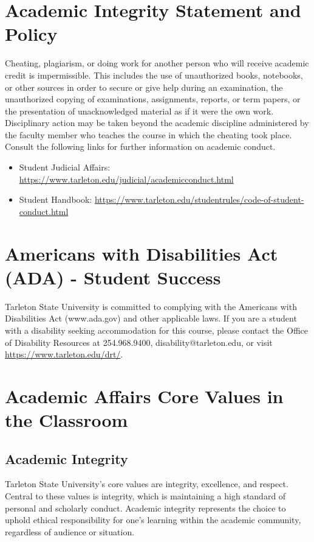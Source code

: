 \documentclass[10pt]{article}
\begin{document}
\section*{Academic Integrity Statement and Policy}
\label{sec:orgbf7f827}

Cheating, plagiarism, or doing work for another person who will receive academic credit is impermissible. This includes the use of unauthorized books, notebooks, or other sources in order to secure or give help during an examination, the unauthorized copying of examinations, assignments, reports, or term papers, or the presentation of unacknowledged material as if it were the own work. Disciplinary action may be taken beyond the academic discipline administered by the faculty member who teaches the course in which the cheating took place. Consult the following links for further information on academic conduct. 
\begin{itemize}
\item Student Judicial Affairs: \url{https://www.tarleton.edu/judicial/academicconduct.html}
\item Student Handbook: \url{https://www.tarleton.edu/studentrules/code-of-student-conduct.html}
\end{itemize}

\section*{Americans with Disabilities Act (ADA) - Student Success}
\label{sec:org26612ac}

Tarleton State University is committed to complying with the Americans with Disabilities Act (www.ada.gov) and other applicable laws. If you are a student with a disability seeking accommodation for this course, please contact the Office of Disability Resources at 254.968.9400, disability@tarleton.edu, or visit \url{https://www.tarleton.edu/drt/}.  

\section*{Academic Affairs Core Values in the Classroom}
\label{sec:org72051e9}

\subsection*{Academic Integrity}
\label{sec:orgc13a6d1}
Tarleton State University's core values are integrity, excellence, and respect. Central to these values is integrity, which is maintaining a high standard of personal and scholarly conduct. Academic integrity represents the choice to uphold ethical responsibility for one’s learning within the academic community, regardless of audience or situation.
\end{document}
